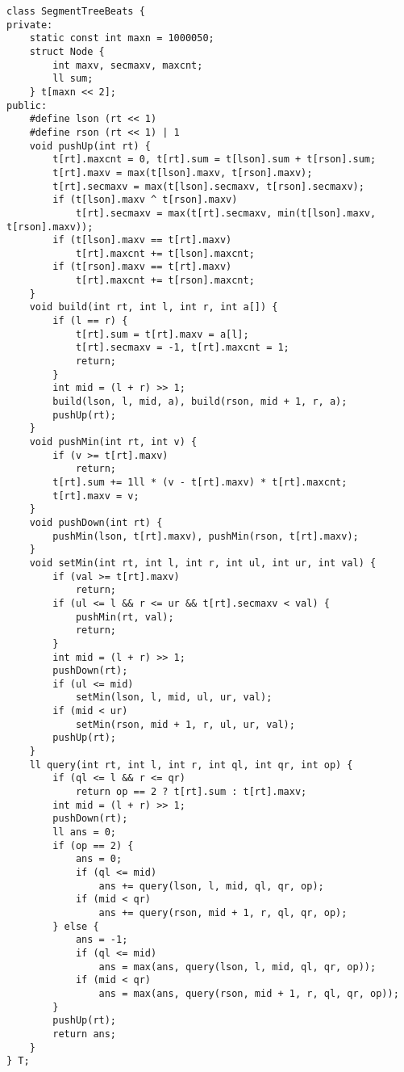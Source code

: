 \begin{verbatim}
class SegmentTreeBeats {
private:
    static const int maxn = 1000050;
    struct Node {
        int maxv, secmaxv, maxcnt;
        ll sum;
    } t[maxn << 2];
public:
    #define lson (rt << 1)
    #define rson (rt << 1) | 1
    void pushUp(int rt) {
        t[rt].maxcnt = 0, t[rt].sum = t[lson].sum + t[rson].sum;
        t[rt].maxv = max(t[lson].maxv, t[rson].maxv);
        t[rt].secmaxv = max(t[lson].secmaxv, t[rson].secmaxv);
        if (t[lson].maxv ^ t[rson].maxv)
            t[rt].secmaxv = max(t[rt].secmaxv, min(t[lson].maxv, t[rson].maxv));
        if (t[lson].maxv == t[rt].maxv)
            t[rt].maxcnt += t[lson].maxcnt;
        if (t[rson].maxv == t[rt].maxv)
            t[rt].maxcnt += t[rson].maxcnt;
    }
    void build(int rt, int l, int r, int a[]) {
        if (l == r) {
            t[rt].sum = t[rt].maxv = a[l];
            t[rt].secmaxv = -1, t[rt].maxcnt = 1;
            return;
        }
        int mid = (l + r) >> 1;
        build(lson, l, mid, a), build(rson, mid + 1, r, a);
        pushUp(rt);
    }
    void pushMin(int rt, int v) {
        if (v >= t[rt].maxv)
            return;
        t[rt].sum += 1ll * (v - t[rt].maxv) * t[rt].maxcnt;
        t[rt].maxv = v;
    }
    void pushDown(int rt) {
        pushMin(lson, t[rt].maxv), pushMin(rson, t[rt].maxv);
    }
    void setMin(int rt, int l, int r, int ul, int ur, int val) {
        if (val >= t[rt].maxv)
            return;
        if (ul <= l && r <= ur && t[rt].secmaxv < val) {
            pushMin(rt, val);
            return;
        }
        int mid = (l + r) >> 1;
        pushDown(rt);
        if (ul <= mid)
            setMin(lson, l, mid, ul, ur, val);
        if (mid < ur)
            setMin(rson, mid + 1, r, ul, ur, val);
        pushUp(rt);
    }
    ll query(int rt, int l, int r, int ql, int qr, int op) {
        if (ql <= l && r <= qr)
            return op == 2 ? t[rt].sum : t[rt].maxv;
        int mid = (l + r) >> 1;
        pushDown(rt);
        ll ans = 0;
        if (op == 2) {
            ans = 0;
            if (ql <= mid)
                ans += query(lson, l, mid, ql, qr, op);
            if (mid < qr)
                ans += query(rson, mid + 1, r, ql, qr, op);
        } else {
            ans = -1;
            if (ql <= mid)
                ans = max(ans, query(lson, l, mid, ql, qr, op));
            if (mid < qr)
                ans = max(ans, query(rson, mid + 1, r, ql, qr, op));
        }
        pushUp(rt);
        return ans;
    }
} T;

\end{verbatim}

\clearpage

